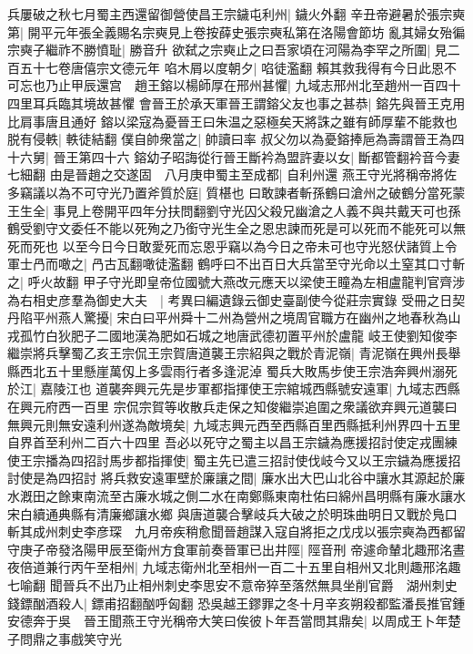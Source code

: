 兵屢破之秋七月蜀主西還留御營使昌王宗鐬屯利州|{
	鐬火外翻}
辛丑帝避暑於張宗奭第|{
	開平元年張全義賜名宗奭見上卷按薛史張宗奭私第在洛陽會節坊}
亂其婦女殆徧宗奭子繼祚不勝憤耻|{
	勝音升}
欲弑之宗奭止之曰吾家頃在河陽為李罕之所圍|{
	見二百五十七卷唐僖宗文德元年}
啗木屑以度朝夕|{
	啗徒濫翻}
賴其救我得有今日此恩不可忘也乃止甲辰還宫　趙王鎔以楊師厚在邢州甚懼|{
	九域志邢州北至趙州一百四十四里耳兵臨其境故甚懼}
會晉王於承天軍晉王謂鎔父友也事之甚恭|{
	鎔先與晉王克用比肩事唐且通好}
鎔以梁寇為憂晉王曰朱温之惡極矣天將誅之雖有師厚輩不能救也脱有侵軼|{
	軼徒結翻}
僕自帥衆當之|{
	帥讀曰率}
叔父勿以為憂鎔捧巵為壽謂晉王為四十六舅|{
	晉王第四十六}
鎔幼子昭誨從行晉王斷衿為盟許妻以女|{
	斷都管翻衿音今妻七細翻}
由是晉趙之交遂固　八月庚申蜀主至成都|{
	自利州還}
燕王守光將稱帝將佐多竊議以為不可守光乃置斧質於庭|{
	質椹也}
曰敢諫者斬孫鶴曰滄州之破鶴分當死蒙王生全|{
	事見上卷開平四年分扶問翻劉守光囚父殺兄幽滄之人義不與共戴天可也孫鶴受劉守文委任不能以死殉之乃銜守光生全之恩忠諫而死是可以死而不能死可以無死而死也}
以至今日今日敢愛死而忘恩乎竊以為今日之帝未可也守光怒伏諸質上令軍士冎而噉之|{
	冎古瓦翻噉徒濫翻}
鶴呼曰不出百日大兵當至守光命以土窒其口寸斬之|{
	呼火故翻}
甲子守光即皇帝位國號大燕改元應天以梁使王瞳為左相盧龍判官齊涉為右相史彦羣為御史大夫　|{
	考異曰編遺錄云御史臺副使今從莊宗實錄}
受冊之日契丹陷平州燕人驚擾|{
	宋白曰平州舜十二州為營州之境周官職方在幽州之地春秋為山戎孤竹白狄肥子二國地漢為肥如石城之地唐武德初置平州於盧龍}
岐王使劉知俊李繼崇將兵擊蜀乙亥王宗侃王宗賀唐道襲王宗紹與之戰於青泥嶺|{
	青泥嶺在興州長舉縣西北五十里懸崖萬仭上多雲雨行者多逢泥淖}
蜀兵大敗馬步使王宗浩奔興州溺死於江|{
	嘉陵江也}
道襲奔興元先是步軍都指揮使王宗綰城西縣號安遠軍|{
	九域志西縣在興元府西一百里}
宗侃宗賀等收散兵走保之知俊繼崇追圍之衆議欲弃興元道襲曰無興元則無安遠利州遂為敵境矣|{
	九域志興元西至西縣百里西縣抵利州界四十五里自界首至利州二百六十四里}
吾必以死守之蜀主以昌王宗鐬為應援招討使定戎團練使王宗播為四招討馬步都指揮使|{
	蜀主先已遣三招討使伐岐今又以王宗鐬為應援招討使是為四招討}
將兵救安遠軍壁於廉讓之間|{
	廉水出大巴山北谷中讓水其源起於廉水漑田之餘東南流至古廉水城之側二水在南鄭縣東南杜佑曰綿州昌明縣有廉水讓水宋白續通典縣有清廉鄉讓水鄉}
與唐道襲合擊岐兵大破之於明珠曲明日又戰於鳬口斬其成州刺史李彦琛　九月帝疾稍愈聞晉趙謀入寇自將拒之戊戌以張宗奭為西都留守庚子帝發洛陽甲辰至衛州方食軍前奏晉軍已出井陘|{
	陘音刑}
帝遽命輦北趣邢洺晝夜倍道兼行丙午至相州|{
	九域志衛州北至相州一百二十五里自相州又北則趣邢洺趣七喻翻}
聞晉兵不出乃止相州刺史李思安不意帝猝至落然無具坐削官爵　湖州刺史錢鏢酗酒殺人|{
	鏢甫招翻酗呼匈翻}
恐吳越王鏐罪之冬十月辛亥朔殺都監潘長推官鍾安德奔于吳　晉王聞燕王守光稱帝大笑曰俟彼卜年吾當問其鼎矣|{
	以周成王卜年楚子問鼎之事戲笑守光}
